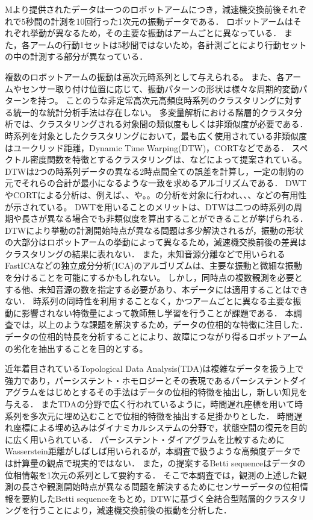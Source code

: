 \documentclass{jarticle}
\begin{document}
Mより提供されたデータは一つのロボットアームにつき，減速機交換前後それぞれで5秒間の計測を10回行った1次元の振動データである．
ロボットアームはそれぞれ挙動が異なるため，その主要な振動はアームごとに異なっている．
また，各アームの行動1セットは5秒間ではないため，各計測ごとにより行動セットの中の計測する部分が異なっている．

複数のロボットアームの振動は高次元時系列として与えられる。
また、各アームやセンサー取り付け位置に応じて、振動パターンの形状は様々な周期的変動パターンを持つ。
ことのうな非定常高次元高頻度時系列のクラスタリングに対する統一的な統計分析手法は存在しない。
多変量解析における階層的クラスタ分析では、クラスタリングされる対象間の類似度もしくは非類似度が必要である．
時系列を対象としたクラスタリングにおいて，最も広く使用されている非類似度はユークリッド距離，Dynamic Time Warping(DTW)\cite{Berndt1996}，CORT\cite{Chouakria2007}などである．
スペクトル密度関数を特徴とするクラスタリングは、などによって提案されている。
DTWは2つの時系列データの異なる2時点間全ての誤差を計算し，一定の制約の元でそれらの合計が最小になるような一致を求めるアルゴリズムである．
DWTやCORTによる分析は、例えば、、や。。の分析を対象に行われ、、、などの有用性が示されている。
DWTを用いることのメリットは、DTWは二つの時系列の周期や長さが異なる場合でも非類似度を算出することができることが挙げられる．
DTWにより挙動の計測開始時点が異なる問題は多少解決されるが，振動の形状の大部分はロボットアームの挙動によって異なるため，減速機交換前後の差異はクラスタリングの結果に表れない．
また，未知音源分離などで用いられるFastICA\cite{Hyvarinen2000}などの独立成分分析(ICA)のアルゴリズムは、主要な振動と微細な振動を分けることを可能にするかもしれない。
しかし，同時点の複数観測を必要とする他、未知音源の数を指定する必要があり、本データには適用することはできない．
時系列の同時性を利用することなく，かつアームごとに異なる主要な振動に影響されない特徴量によって教師無し学習を行うことが課題である．
本調査では，以上のような課題を解決するため，データの位相的な特徴に注目した．
データの位相的特長を分析することにより、故障につながり得るロボットアームの劣化を抽出することを目的とする。

近年着目されているTopological Data Analysis(TDA)は複雑なデータを扱う上で強力であり，パーシステント・ホモロジー\cite{Edelsbrunner2002}とその表現であるパーシステントダイアグラム\cite{Otter2017}をはじめとするその手法はデータの位相的特徴を抽出し，新しい知見を与える．
またTDAの分野で広く行われているように，時間遅れ座標を用いて時系列を多次元に埋め込むことで位相的特徴を抽出する足掛かりとした．
時間遅れ座標による埋め込みはダイナミカルシステムの分野で，状態空間の復元を目的に広く用いられている．
パーシステント・ダイアグラムを比較するためにWasserstein距離\cite{Mileyko2011}がしばしば用いられるが，本調査で扱うような高頻度データでは計算量の観点で現実的ではない．
また，\cite{Umeda2017}の提案するBetti sequenceはデータの位相情報を1次元の系列として要約する．
そこで本調査では，観測の上述した観測の長さや観測開始時点が異なる問題を解決するためにセンサーデータの位相情報を要約したBetti sequenceをもとめ，DTWに基づく全結合型階層的クラスタリングを行うことにより，減速機交換前後の振動を分析した．
\end{document}
